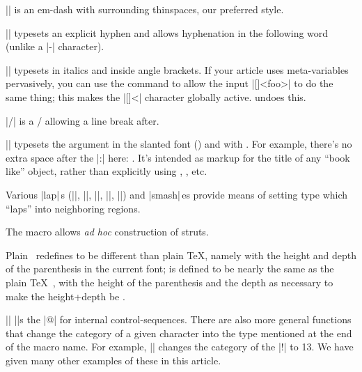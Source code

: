 {\item |\Dash| is an em-dash with surrounding thin\-spaces, our preferred style.

\item |\hyph| typesets an explicit hyphen and allows hyphenation in the
following word (unlike a |-| character).

\item || typesets  in italics and inside angle
brackets. If your article uses meta-variables pervasively, you can use
the command  to allow the input
|[\disablemetacode]<foo>| to do the
same thing; this makes the |[\disablemetacode]<| character globally active.
 undoes this.

\item |\slash| is a / allowing a line break after.

\item || typesets the argument in the
slanted font () and with . For example, there's
no extra space after the |:| here: . It's intended
as markup for the title of any ``book like'' object, rather than
explicitly using , , etc.

\item Various |\*lap|\,s (|\ulap|, |\dlap|, |\xlap|,
|\ylap|, |\zlap|) and |\*smash|\,es provide means of setting type
which ``laps'' into neighboring regions.

\item The macro
\verbatim
{}
\endverbatim
allows {\it ad hoc\/} construction of
struts.

Plain \TUB\ redefines  to be different than plain \TeX, namely
with the height and depth of the parenthesis in the current font;
 is defined to be nearly the same as the plain \TeX\
, with the height of the parenthesis and the depth as
necessary to make the height+depth be .

\item |\makeatletter| |\catcode|s the |@| for internal control-sequences.
There are also more general functions
\verbatim
\makeescape
\makebgroup
\makeegroup
\makeletter
\makeother
\makeactive
\endverbatim
that change the category of a given character into the type mentioned
at the end of the macro name.  For example, |\makeactive\!| changes the
category of the |!| to 13.  We have given many other examples of these in
this article.

}
